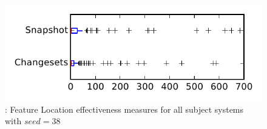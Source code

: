 
\begin{figure}
\centering
\includegraphics[height=0.4\textheight]{figures/flt_seed/rq1_tiny_38}
\caption{\rone: Feature Location effectiveness measures for all subject systems with $seed=38$}
\label{fig:flt_seed:rq1:tiny}
\end{figure}
